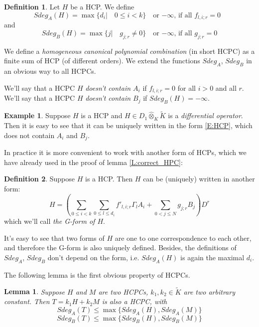 \documentclass[11pt]{article}
\theoremstyle{definition}
\newtheorem{Def}{Definition}[section]
\newtheorem{ex}{Example}[section]
\theoremstyle{plain}
\newtheorem{lemma}{Lemma}[section]
\numberwithin{equation}{section}
\begin{document}
\begin{Def}	
\label{D:Sdeg_A}
Let $H$ be a HCP. We define 
$$Sdeg_A(H)=\max \{d_i|\quad 0\leq i<k \} \quad \mbox{or $-\infty$, if all $f_{l,i;r}=0$ } 
$$
and 
$$Sdeg_B(H)=\max\{j|\quad g_{j;r}\neq0\} \quad \mbox{or $-\infty$, if all $g_{j;r}=0$}
$$

We define a  {\it homogeneous canonical polynomial combination} (in short HCPC) as a finite sum of HCP (of different orders).
We extend the functions $Sdeg_A$, $Sdeg_B$ in an obvious way to all HCPCs. 

We'll say that a HCPC $H$ {\it doesn't contain $A_i$} if $f_{l,i;r}=0$ for all $i>0$ and all $r$. We'll say that a HCPC $H$ {\it doesn't contain $B_j$} if $Sdeg_B(H)=-\infty$.
\end{Def}

\begin{ex}
\label{Ex:HCP-dif-op}
Suppose $H$ is a HCP and $H\in D_1\hat{\otimes}_K\tilde{K}$ is a {\it differential operator}. Then it is easy to see that it can be uniquely written in the form \eqref{E:HCP}, which does not contain $A_i$ and $B_j$. 
\end{ex}

In practice it is more convenient to work with another form of HCPs, which we have already used in the proof of lemma \ref{L:correct_HPC}:  

\begin{Def}
\label{D:G-form}
	Suppose $H$ is a HCP. Then  $H$ can be (uniquely) written in another form: 
	$$
	H=(\sum_{0\leq i<k}\sum_{0\leq l\leq d_i} f'_{l,i;r}\Gamma_lA_i+\sum_{0<j\leq N}g_{j;r}B_{j})D^{r}
	$$
	which we'll call {\it the G-form of $H$}.
\end{Def}

It's easy to see that two forms of $H$ are one to one correspondence to each other, and therefore the G-form is also uniquely defined. Besides, the definitions of $Sdeg_A$, $Sdeg_B$ don't depend on the form, i.e. $Sdeg_A(H)$ is again the maximal $d_i$. 

The following lemma is the first obvious property of HCPCs.

\begin{lemma}
\label{L:obvious}
	Suppose $H$ and $M$ are two HCPCs, $k_1,k_2\in \tilde{K}$ are two arbitrary constant. Then $T=k_1H+k_2M$ is also a HCPC, with 
	$$
	Sdeg_A(T)\leq \max\{Sdeg_A(H), Sdeg_A(M) \}
	$$$$
	Sdeg_B(T)\leq \max\{Sdeg_B(H), Sdeg_B(M) \}
	$$
\end{lemma}
\end{document}
